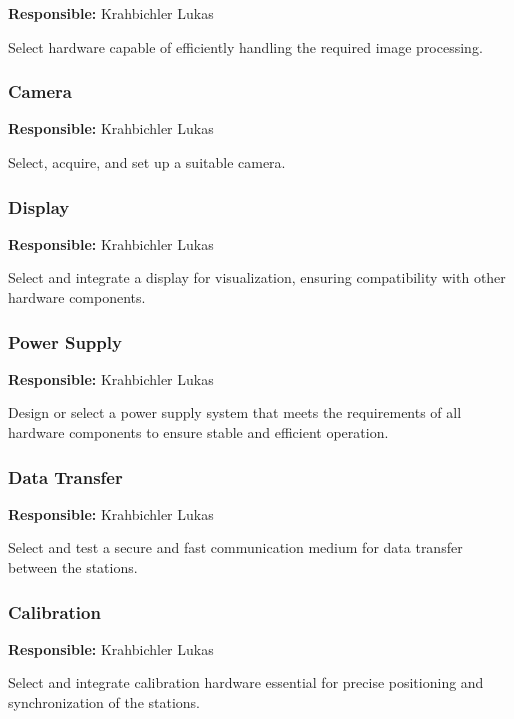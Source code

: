 \textbf{Responsible:} Krahbichler Lukas

Select hardware capable of efficiently handling the required image processing.

\subsubsection{Camera} %

\textbf{Responsible:} Krahbichler Lukas

Select, acquire, and set up a suitable camera.

\subsubsection{Display} %

\textbf{Responsible:} Krahbichler Lukas

Select and integrate a display for visualization, ensuring compatibility with other hardware components.

\subsubsection{Power Supply}

\textbf{Responsible:} Krahbichler Lukas

Design or select a power supply system that meets the requirements of all hardware components to ensure stable and efficient operation.

\subsubsection{Data Transfer}

\textbf{Responsible:} Krahbichler Lukas

Select and test a secure and fast communication medium for data transfer between the stations.

\subsubsection{Calibration}

\textbf{Responsible:} Krahbichler Lukas

Select and integrate calibration hardware essential for precise positioning and synchronization of the stations.

